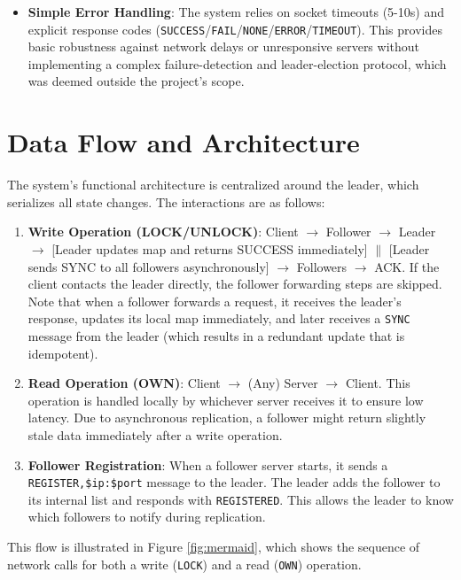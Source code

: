 \documentclass[a4paper,11pt]{article}
\begin{document}
\begin{itemize}
    \item \textbf{Simple Error Handling}: The system relies on socket timeouts (5-10s) and explicit response codes (\texttt{SUCCESS}/\texttt{FAIL}/\texttt{NONE}/\texttt{ERROR}/\texttt{TIMEOUT}). This provides basic robustness against network delays or unresponsive servers without implementing a complex failure-detection and leader-election protocol, which was deemed outside the project's scope.
\end{itemize}

\section{Data Flow and Architecture}
The system's functional architecture is centralized around the leader, which serializes all state changes. The interactions are as follows:

\begin{enumerate}
    \item \textbf{Write Operation (LOCK/UNLOCK)}: Client $\rightarrow$ Follower $\rightarrow$ Leader $\rightarrow$ [Leader updates map and returns SUCCESS immediately] $\parallel$ [Leader sends SYNC to all followers asynchronously] $\rightarrow$ Followers $\rightarrow$ ACK. If the client contacts the leader directly, the follower forwarding steps are skipped. Note that when a follower forwards a request, it receives the leader's response, updates its local map immediately, and later receives a \texttt{SYNC} message from the leader (which results in a redundant update that is idempotent).
    \item \textbf{Read Operation (OWN)}: Client $\rightarrow$ (Any) Server $\rightarrow$ Client. This operation is handled locally by whichever server receives it to ensure low latency. Due to asynchronous replication, a follower might return slightly stale data immediately after a write operation.
    \item \textbf{Follower Registration}: When a follower server starts, it sends a \texttt{REGISTER,\$ip:\$port} message to the leader. The leader adds the follower to its internal list and responds with \texttt{REGISTERED}. This allows the leader to know which followers to notify during replication.
\end{enumerate}

This flow is illustrated in Figure \ref{fig:mermaid}, which shows the sequence of network calls for both a write (\texttt{LOCK}) and a read (\texttt{OWN}) operation.
\end{document}
